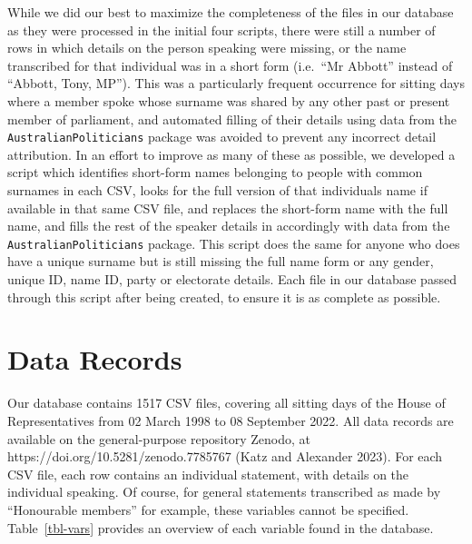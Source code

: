 \documentclass[
  letterpaper,
  DIV=11,
  numbers=noendperiod]{scrartcl}
\begin{document}
While we did our best to maximize the completeness of the files in our
database as they were processed in the initial four scripts, there were
still a number of rows in which details on the person speaking were
missing, or the name transcribed for that individual was in a short form
(i.e.~``Mr Abbott'' instead of ``Abbott, Tony, MP''). This was a
particularly frequent occurrence for sitting days where a member spoke
whose surname was shared by any other past or present member of
parliament, and automated filling of their details using data from the
\texttt{AustralianPoliticians} package was avoided to prevent any
incorrect detail attribution. In an effort to improve as many of these
as possible, we developed a script which identifies short-form names
belonging to people with common surnames in each CSV, looks for the full
version of that individuals name if available in that same CSV file, and
replaces the short-form name with the full name, and fills the rest of
the speaker details in accordingly with data from the
\texttt{AustralianPoliticians} package. This script does the same for
anyone who does have a unique surname but is still missing the full name
form or any gender, unique ID, name ID, party or electorate details.
Each file in our database passed through this script after being
created, to ensure it is as complete as possible.

\hypertarget{data-records}{%
\section{Data Records}\label{data-records}}

Our database contains 1517 CSV files, covering all sitting days of the
House of Representatives from 02 March 1998 to 08 September 2022. All
data records are available on the general-purpose repository Zenodo, at
https://doi.org/10.5281/zenodo.7785767 (Katz and Alexander 2023). For
each CSV file, each row contains an individual statement, with details
on the individual speaking. Of course, for general statements
transcribed as made by ``Honourable members'' for example, these
variables cannot be specified. Table~\ref{tbl-vars} provides an overview
of each variable found in the database.
\end{document}
